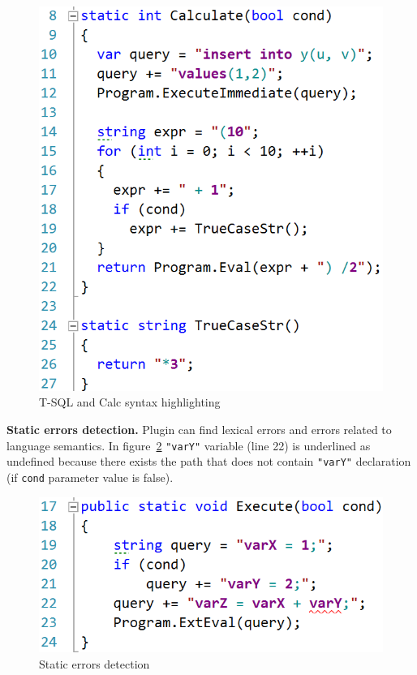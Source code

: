 \documentclass{sig-alternate-05-2015}
\begin{document}
\begin{figure}[h!]
    \begin{center}
        \includegraphics[scale=0.4]{Figures/sql_and_calc_cycle.PNG}
    \end{center}
    \caption{T-SQL and Calc syntax highlighting}
    \label{highlighting}
\end{figure}

\textbf{Static errors detection.} Plugin can find lexical errors and errors related to language semantics. In figure~\ref{static_error} \verb|"varY"| variable (line 22) is underlined as undefined because there exists the path that does not contain \verb|"varY"| declaration (if \verb|cond| parameter value is false).

\begin{figure}[h!]
    \begin{center}
        \includegraphics[scale=0.4]{Figures/Undefined_variable.PNG}
    \end{center}
    \caption{Static errors detection}
    \label{static_error}
\end{figure}
\end{document}
